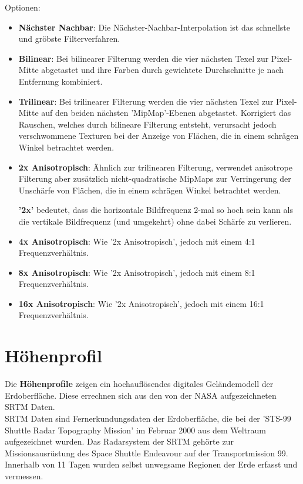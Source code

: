 \documentclass[10pt]{scrreprt}
\begin{document}
Optionen:
\begin{itemize}    
\item \textbf{Nächster Nachbar}: Die Nächster-Nachbar-Interpolation ist das schnellste und gröbste Filterverfahren.
\item \textbf{Bilinear}: Bei bilinearer Filterung werden die vier nächsten Texel zur Pixel-Mitte abgetastet und ihre Farben durch gewichtete Durchschnitte je nach Entfernung kombiniert.
\item \textbf{Trilinear}: Bei trilinearer Filterung werden die vier nächsten Texel zur Pixel-Mitte auf den beiden nächsten 'MipMap'-Ebenen abgetastet. Korrigiert das Rauschen, welches durch bilineare Filterung entsteht, verursacht jedoch verschwommene Texturen bei der Anzeige von Flächen, die in einem schrägen Winkel betrachtet werden.
\item \textbf{2x Anisotropisch}: Ähnlich zur trilinearen Filterung, verwendet anisotrope Filterung aber zusätzlich nicht-quadratische MipMaps zur Verringerung der Unschärfe von Flächen, die in einem schrägen Winkel betrachtet werden.

\textbf{'2x'} bedeutet, dass die horizontale Bildfrequenz 2-mal so hoch sein kann als die vertikale Bildfrequenz (und umgekehrt) ohne dabei Schärfe zu verlieren.
\item \textbf{4x Anisotropisch}: Wie '2x Anisotropisch', jedoch mit einem 4:1 Frequenzverhältnis.
\item \textbf{8x Anisotropisch}: Wie '2x Anisotropisch', jedoch mit einem 8:1 Frequenzverhältnis.
\item \textbf{16x Anisotropisch}: Wie '2x Anisotropisch', jedoch mit einem 16:1 Frequenzverhältnis.
\end{itemize}


\newpage
\section{Höhenprofil} 
Die \textbf{Höhenprofile} zeigen ein hochauflösendes digitales Geländemodell der Erdoberfläche. Diese errechnen sich aus den von der NASA  aufgezeichneten SRTM  Daten.\\

SRTM Daten sind Fernerkundungsdaten der Erdoberfläche, die bei der 'STS-99 Shuttle Radar Topography Mission' im Februar 2000 aus dem Weltraum aufgezeichnet wurden. Das Radarsystem der SRTM gehörte zur Missionsausrüstung des Space Shuttle Endeavour auf der Transportmission 99. Innerhalb von 11 Tagen wurden selbst unwegsame Regionen der Erde erfasst und vermessen.\\
\end{document}
